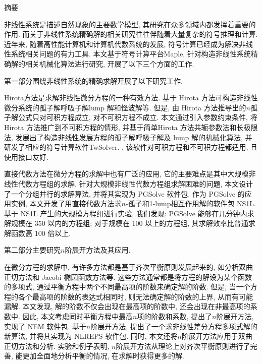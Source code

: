 {}
\centerline{\heiti 摘\quad 要}

\linespread{1.4} \bigskip

非线性系统是描述自然现象的主要数学模型, 其研究在众多领域内都发挥着重要的作用. 而关于非线性系统精确解的相关研究往往伴随着大量复杂的符号推理和计算. 近年来, 随着高性能计算机和计算机代数系统的发展, 符号计算已经成为解决非线性系统相关问题的有力工具. 本文基于符号计算平台Maple, 针对构造非线性系统精确解的相关机械化算法进行研究, 开展了以下三个方面的工作. 

第一部分围绕非线性系统的精确求解开展了以下研究工作. 

Hirota方法是求解非线性微分方程的一种有效方法. 基于 Hirota 方法可构造非线性微分系统的孤子解\D 呼吸子解\D lump 解和怪波解等. 但是, 由 Hirota 方法推导出的$n$孤子解公式只对可积方程成立, 对不可积方程不成立. 本文通过引入参数约束条件, 将 Hirota 方法推广到不可积方程的情形, 并基于简单Hirota 方法\D 共轭参数法和长极限法, 发展出了构造非线性发展方程的孤子解\D 呼吸子解及 lump 解的机械化算法, 并研发了相应的符号计算软件TwSolver. . 该软件对可积方程和不可积方程都适用, 且使用接口友好. 

直接代数方法在微分方程的求解中也有广泛的应用, 它的主要难点是其中大规模非线性代数方程组的求解. 针对大规模非线性代数方程组求解困难的问题, 本文设计了一个分组并行的求解算法, 并将其实现为 PGSolve 软件包. 作为 PGSolve 的应用实例, 本文开发了用直接代数方法求$n$-孤子和1-lump相互作用解的软件包 NS1L. 基于 NS1L 产生的大规模方程组进行实验, 我们发现: PGSolve 能够在几分钟内求解规模在 350 以内的方程组; 对于规模在 100 以上的方程组, 其求解效率比普通求解函数高 100 倍以上. 

第二部分主要研究$n$阶展开方法及其应用. 

在微分方程的求解中, 有许多方法都是基于齐次平衡原则发展起来的, 如\Painleve{}分析\D 双曲正切方法和 Jacobi 椭圆函数方法等. 这些方法通常都是将方程的解设为某个函数的多项式, 通过平衡方程中两个不同最高项的阶数来确定解的阶数. 但是, 当一个方程的各个最高项的阶数的表达式相同时, 则无法确定解的阶数的上界, 从而有可能漏解. 本文发现, 解的阶数不仅会出现在最高项的阶数中, 还会出现在非最高项的系数中. 因此, 本文考虑同时平衡方程中最高$n$项的阶数和系数, 提出了$n$阶展开方法, 实现了 NEM 软件包. 基于$n$阶展开方法, 提出了一个求非线性差分方程多项式解的新算法, 并将其实现为 NLREPS 软件包. 同时, 本文还将$n$阶展开方法应用于双曲正切方法和\Painleve{}分析. 实验和例子表明, $n$阶展开方法从理论上对齐次平衡原则进行了完善, 能更加全面地分析平衡的情况, 在求解时获得更多的解. 

